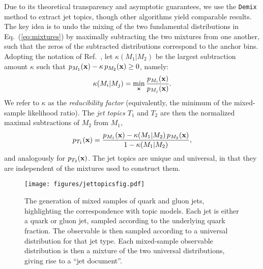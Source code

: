 \documentclass[aps,prl,floatfix,preprintnumbers,twocolumn,groupedaddress,nofootinbib,longbibliography]{revtex4-1}
\DeclareRobustCommand{\Eq}[1]{Eq.~(\ref{#1})}
\DeclareRobustCommand{\Ref}[1]{Ref.~\cite{#1}}
\begin{document}
Due to its theoretical transparency and asymptotic guarantees, we use the \texttt{Demix} method \cite{katz2017decontamination} to extract jet topics, though other algorithms yield comparable results.
%
The key idea is to undo the mixing of the two fundamental distributions in \Eq{eq:mixtures} by maximally subtracting the two mixtures from one another, such that the zeros of the subtracted distributions correspond to the anchor bins.
%
Adopting the notation of \Ref{katz2017decontamination}, let $\kappa(M_1|M_2)$ be the largest subtraction amount $\kappa$ such that $p_{M_1}({\bf x}) - \kappa\, p_{M_2}({\bf x})\ge 0$, namely:
\begin{equation}\label{eq:kappa}
\kappa(M_i|M_j) = \min_{\bf x} \frac{p_{M_i}({\bf x})}{p_{M_j}({\bf x})}.
\end{equation}
We refer to $\kappa$ as the \emph{reducibility factor} (equivalently, the minimum of the mixed-sample likelihood ratio).
%
The \emph{jet topics} $T_1$ and $T_2$ are then the normalized maximal subtractions of $M_2$ from $M_1$,
\begin{equation}
\label{eq:residue}
p_{T_1}({\bf x}) = \frac{p_{M_1}({\bf x}) - \kappa(M_1|M_2) \, p_{M_2}({\bf x})}{1 - \kappa(M_1|M_2)},
\end{equation}
and analogously for $p_{T_2}({\bf x})$.
%
The jet topics are unique and universal, in that they are independent of the mixtures used to construct them.


\begin{figure}[t]
\centering
\texttt{[image: figures/jettopicsfig.pdf]}
\caption{The generation of mixed samples of quark and gluon jets, highlighting the correspondence with topic models.
%
Each jet is either a quark or gluon jet, sampled according to the underlying quark fraction.
%
The observable is then sampled according to a universal distribution for that jet type.
%
Each mixed-sample observable distribution is then a mixture of the two universal distributions, giving rise to a ``jet document''.
}
\label{fig:jettopics}
\end{figure}
\end{document}
